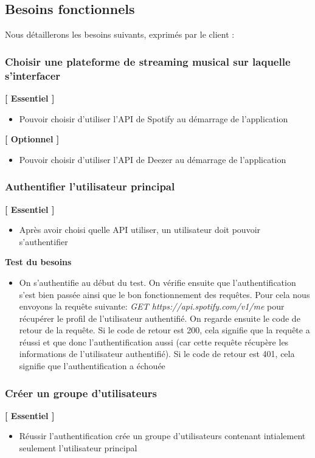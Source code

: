 \documentclass{article}
\begin{document}
		\subsection{Besoins fonctionnels}
		Nous détaillerons les besoins suivants, exprimés par le client :
		\subsubsection{Choisir une plateforme de streaming musical sur laquelle s'interfacer}
		\textbf{[ Essentiel ]}
		\begin{itemize}
			\item Pouvoir choisir d'utiliser l'API de Spotify au démarrage de l'application
		\end{itemize}
		\textbf{[ Optionnel ]}
		\begin{itemize}
			\item Pouvoir choisir d'utiliser l'API de Deezer au démarrage de l'application
		\end{itemize}
		\subsubsection{Authentifier l'utilisateur principal} \label{authentification}
		\textbf{[ Essentiel ]}
		\begin{itemize}
			\item Après avoir choisi quelle API utiliser, un utilisateur doit pouvoir s'authentifier
		\end{itemize}
		\textbf{Test du besoins} 
		\begin{itemize}
			\item On s'authentifie au début du test. On vérifie ensuite que l'authentification s'est bien passée ainsi que le bon fonctionnement des requêtes. Pour cela nous envoyons la requête suivante: \textit{GET https://api.spotify.com/v1/me} pour récupérer le profil de l'utilisateur authentifié. On regarde ensuite le code de retour de la requête. Si le code de retour est 200, cela signifie que la requête a réussi et que donc l'authentification aussi (car cette requête récupère les informations de l'utilisateur authentifié). Si le code de retour est 401, cela signifie que l'authentification a échouée
		\end{itemize}
		\newpage
		\subsubsection{Créer un groupe d'utilisateurs}
		\textbf{[ Essentiel ]}
		\begin{itemize}
			\item Réussir l'authentification crée un groupe d'utilisateurs contenant intialement seulement l'utilisateur principal
		\end{itemize}
\end{document}
